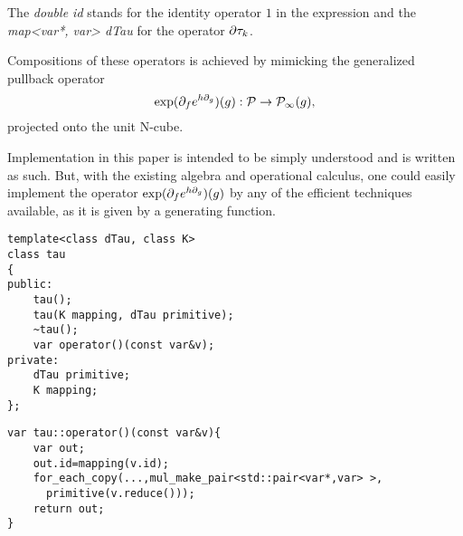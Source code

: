         The \emph{double id} stands for the identity operator $1$ in the expression and the \emph{map<var*, var> dTau} for the operator $\partial\tau_k$.
        
        Compositions of these operators is achieved by mimicking the generalized pullback operator \cite[Remark~11]{OperationalCalculus}
        \begin{equation}\label{eq:opKompo}
          \exp(\partial_fe^{h\partial_g})(g): \mathcal{P}\to\mathcal{P}_\infty(g),
          \end{equation}
          projected onto the unit N-cube.
          
          \begin{opomba}
          Implementation in this paper is intended to be simply understood and is written as such. But, with the existing algebra and operational calculus, one could easily implement the operator $\exp(\partial_fe^{h\partial_g})(g)$ by any of the efficient techniques available, as it is given by a generating function.
          \end{opomba}
        
\begin{lstlisting}
template<class dTau, class K>
class tau
{
public:
    tau();
    tau(K mapping, dTau primitive);
    ~tau();
    var operator()(const var&v);
private:
    dTau primitive;
    K mapping;
};
\end{lstlisting}        
        
\begin{lstlisting}
var tau::operator()(const var&v){
    var out;
    out.id=mapping(v.id);
    for_each_copy(...,mul_make_pair<std::pair<var*,var> >, 
      primitive(v.reduce()));
    return out;
}
\end{lstlisting}
